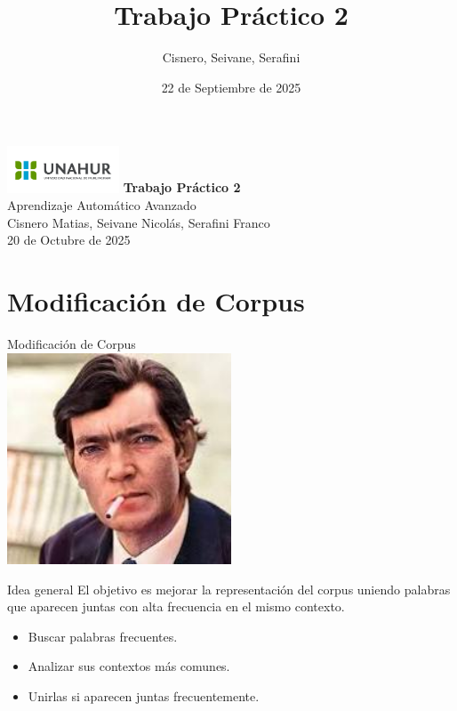 \documentclass{beamer}
\title{Trabajo Práctico 2}
\author{Cisnero, Seivane, Serafini}
\date{22 de Septiembre de 2025}
\begin{document}
\begin{frame}
	\centering
	\includegraphics[width=0.25\textwidth]{UNAHUR (2)}
	\vfill
	{\huge \textbf{Trabajo Práctico 2}}\\[0.2cm]
	{\Large Aprendizaje Automático Avanzado}\\
	\vfill
	{\large Cisnero Matias, Seivane Nicolás, Serafini Franco}\\
	{\small 20 de Octubre de 2025}
\end{frame}


\section{Modificación de Corpus}

\begin{frame}{}
	\centering
	\Large Modificación de Corpus\\
	\vspace{0.8cm}
	\includegraphics[width=0.5\textwidth]{imagen_cortazar}
\end{frame}
	
\begin{frame}{Idea general}
	El objetivo es mejorar la representación del corpus uniendo palabras que aparecen juntas con alta frecuencia en el mismo contexto.
	\begin{itemize}
		\item Buscar palabras frecuentes.
		\item Analizar sus contextos más comunes.
		\item Unirlas si aparecen juntas frecuentemente.
	\end{itemize}
\end{frame}
\end{document}

